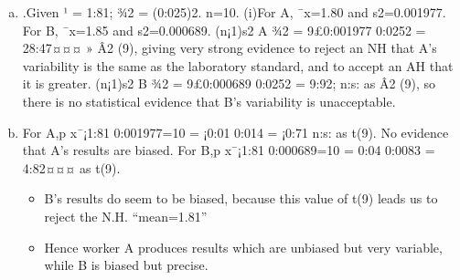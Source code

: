 \documentclass[a4paper,12pt]{article}
\begin{document}
\begin{enumerate}[(a)]
\item
.Given ¹ = 1:81; ¾2 = (0:025)2. n=10.
(i)For A, ¯x=1.80 and s2=0.001977.
For B, ¯x=1.85 and s2=0.000689.
(n¡1)s2
A
¾2 = 9£0:001977
0:0252 = 28:47¤¤¤ » Â2
(9), giving very strong evidence to reject an NH that A’s
variability is the same as the laboratory standard, and to accept an AH that it is greater.
(n¡1)s2
B
¾2 = 9£0:000689
0:0252 = 9:92; n:s: as Â2
(9), so there is no statistical evidence that B’s variability
is unacceptable.
\item For A,p x¯¡1:81
0:001977=10
= ¡0:01
0:014 = ¡0:71 n:s: as t(9).
No evidence that A’s results are biased.
For B,p x¯¡1:81
0:000689=10
= 0:04
0:0083 = 4:82¤¤¤ as t(9).
\begin{itemize}
    \item B’s results do seem to be biased, because this value of t(9) leads us to reject the N.H. “mean=1.81”
\item Hence worker A produces results which are unbiased but very variable, while B is biased but precise.
\end{itemize}

\end{enumerate}
\end{document}
